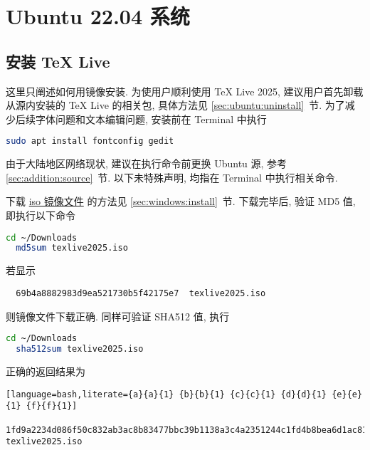 
\chapter{Ubuntu 22.04 系统}

\section{安装 \TeX{} Live}\label{chap:ubuntu:sec:install}

这里只阐述如何用镜像安装.
为使用户顺利使用 \TeX{} Live 2025,
建议用户首先卸载从源内安装的 \TeX{} Live 的相关包,
具体方法见 \ref{sec:ubuntu:uninstall}~节.
为了减少后续字体问题和文本编辑问题,
安装前在 \textsf{Terminal} 中执行
\begin{lstlisting}[language=bash]
  sudo apt install fontconfig gedit
\end{lstlisting}
由于大陆地区网络现状,
建议在执行命令前更换 Ubuntu 源,
参考 \ref{sec:addition:source}~节.
以下未特殊声明,
均指在  \textsf{Terminal} 中执行相关命令.

下载
\href{https://mirrors.ctan.org/systems/texlive/Images/texlive2025.iso}{iso 镜像文件}
的方法见 \ref{sec:windows:install}~节.
下载完毕后,
验证 MD5 值,
即执行以下命令
\begin{lstlisting}[language = bash]
  cd ~/Downloads
  md5sum texlive2025.iso
\end{lstlisting}
若显示
\begin{lstlisting}
  69b4a8882983d9ea521730b5f42175e7  texlive2025.iso
\end{lstlisting}
则镜像文件下载正确.
同样可验证 SHA512 值,
执行
\begin{lstlisting}[language = bash]
  cd ~/Downloads
  sha512sum texlive2025.iso
\end{lstlisting}
正确的返回结果为
\begin{lstlisting}[language=bash,literate={a}{a}{1} {b}{b}{1} {c}{c}{1} {d}{d}{1} {e}{e}{1} {f}{f}{1}]
  1fd9a2234d086f50c832ab3ac8b83477bbc39b1138a3c4a2351244c1fd4b8bea6d1ac81d4a5b0cba95f2e82c00f0d9df5b33189eb222e4bae5dae1523ef0da0e  texlive2025.iso
\end{lstlisting}

